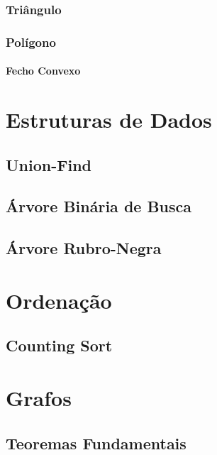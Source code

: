         \subsection{Triângulo}
            
            \newpage
        \subsection{Polígono}
            
            \newpage
            \subsubsection{Fecho Convexo}
                
            \newpage
        
\chapter{Estruturas de Dados}
    \section{Union-Find}
        
    \newpage
    \section{Árvore Binária de Busca}
        
    \newpage
    \section{Árvore Rubro-Negra}
        
    \newpage

\chapter{Ordenação}
    \section{Counting Sort}
        
\newpage

\chapter{Grafos}
    \section{Teoremas Fundamentais}
        
    \newpage
